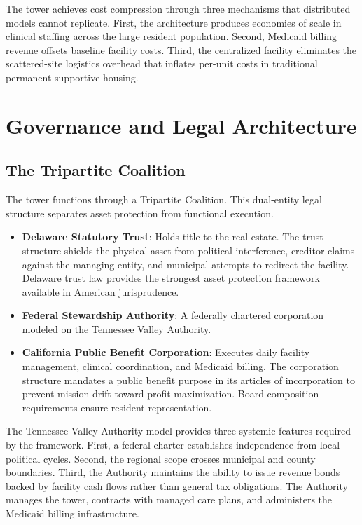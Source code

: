 \documentclass[12pt, letterpaper]{article}
\begin{document}
The tower achieves cost compression through three mechanisms that distributed models cannot replicate. First, the architecture produces economies of scale in clinical staffing across the large resident population. Second, Medicaid billing revenue offsets baseline facility costs. Third, the centralized facility eliminates the scattered-site logistics overhead that inflates per-unit costs in traditional permanent supportive housing.

\newpage
\section{Governance and Legal Architecture}

\subsection{The Tripartite Coalition}

The tower functions through a Tripartite Coalition. This dual-entity legal structure separates asset protection from functional execution.

\begin{itemize}
    \item \textbf{Delaware Statutory Trust}: Holds title to the real estate. The trust structure shields the physical asset from political interference, creditor claims against the managing entity, and municipal attempts to redirect the facility. Delaware trust law provides the strongest asset protection framework available in American jurisprudence.
    \item \textbf{Federal Stewardship Authority}: A federally chartered corporation modeled on the Tennessee Valley Authority.
    \item \textbf{California Public Benefit Corporation}: Executes daily facility management, clinical coordination, and Medicaid billing. The corporation structure mandates a public benefit purpose in its articles of incorporation to prevent mission drift toward profit maximization. Board composition requirements ensure resident representation.
\end{itemize}

The Tennessee Valley Authority model provides three systemic features required by the framework. First, a federal charter establishes independence from local political cycles. Second, the regional scope crosses municipal and county boundaries. Third, the Authority maintains the ability to issue revenue bonds backed by facility cash flows rather than general tax obligations. The Authority manages the tower, contracts with managed care plans, and administers the Medicaid billing infrastructure.
\end{document}

